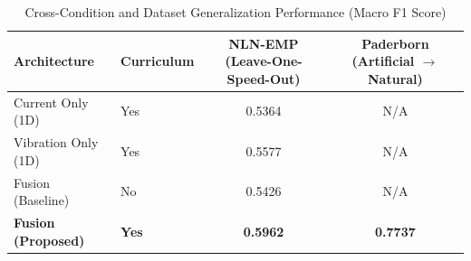 \begin{table}[t]
\centering
\caption{Cross-Condition and Dataset Generalization Performance (Macro F1 Score)}
\label{tab:cross_condition_generalization}
\begin{tabular}{llcc}
\hline
\textbf{Architecture} & \textbf{Curriculum} & \textbf{NLN-EMP (Leave-One-Speed-Out)} & \textbf{Paderborn (Artificial $\rightarrow$ Natural)} \\
\hline
Current Only (1D) & Yes & 0.5364 & N/A \\
Vibration Only (1D) & Yes & 0.5577 & N/A \\
Fusion (Baseline) & No & 0.5426 & N/A \\
\textbf{Fusion (Proposed)} & \textbf{Yes} & \textbf{0.5962} & \textbf{0.7737} \\
\hline
\end{tabular}
\end{table}
